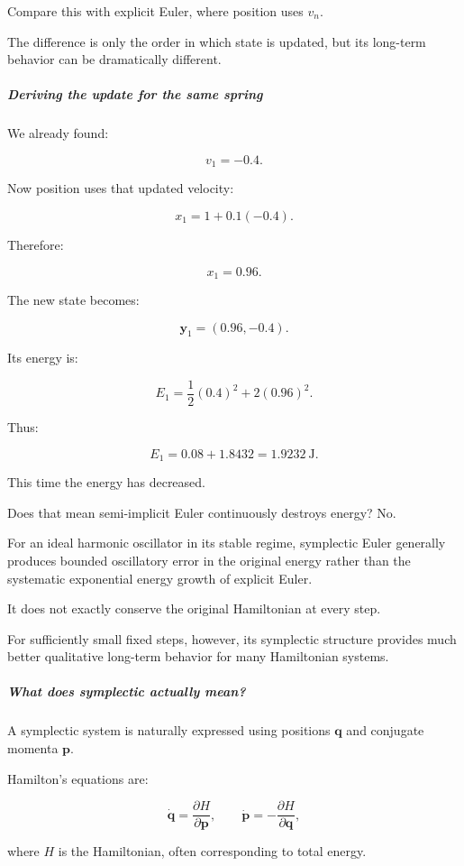 Compare this with explicit Euler, where position uses \(v_n\).

The difference is only the order in which state is updated, but its long-term behavior can be dramatically different.

\subparagraph{Deriving the update for the same spring}\label{02-foundations-ii-ch025-deriving-the-update-for-the-same-spring}

We already found:

\[
v_1=-0.4.
\]

Now position uses that updated velocity:

\[
x_1=1+0.1(-0.4).
\]

Therefore:

\[
\boxed{x_1=0.96}.
\]

The new state becomes:

\[
\boxed{\mathbf y_1=(0.96,-0.4)}.
\]

Its energy is:

\[
E_1= \frac12(0.4)^2+ 2(0.96)^2.
\]

Thus:

\[
E_1=0.08+1.8432=\boxed{1.9232\ \mathrm J}.
\]

This time the energy has decreased.

Does that mean semi-implicit Euler continuously destroys energy? No.

For an ideal harmonic oscillator in its stable regime, symplectic Euler generally produces bounded oscillatory error in the original energy rather than the systematic exponential energy growth of explicit Euler.

It does not exactly conserve the original Hamiltonian at every step.

For sufficiently small fixed steps, however, its symplectic structure provides much better qualitative long-term behavior for many Hamiltonian systems.

\subparagraph{What does symplectic actually mean?}\label{02-foundations-ii-ch025-what-does-symplectic-actually-mean}

A symplectic system is naturally expressed using positions \(\mathbf q\) and conjugate momenta \(\mathbf p\).

Hamilton's equations are:

\[
\dot{\mathbf q}=\frac{\partial H}{\partial\mathbf p}, \qquad \dot{\mathbf p}=-\frac{\partial H}{\partial\mathbf q},
\]

where \(H\) is the Hamiltonian, often corresponding to total energy.

